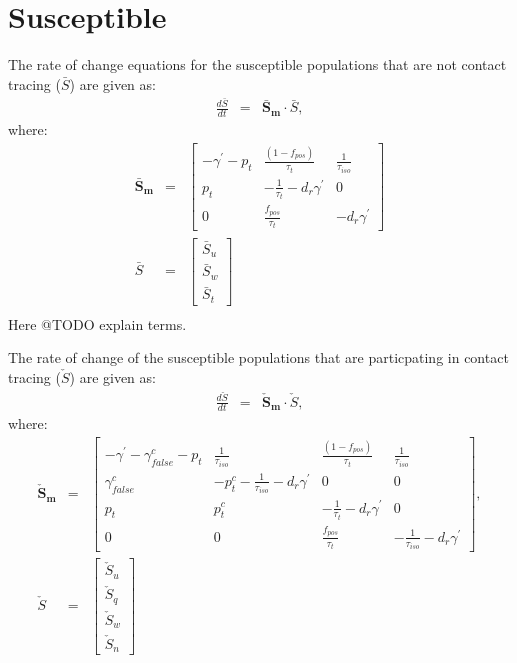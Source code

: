 \documentclass[notitlepage, superscriptaddress]{revtex4-2}
\begin{document}
\section{Susceptible}
The rate of change equations for the susceptible populations that are not contact tracing ($\bar{S}$) are given as:
\begin{eqnarray}
\frac{d\bar{S}}{dt} &=& \boldsymbol{\bar{S}_{m}} \cdot  \bar{S}, 
\end{eqnarray}
where:
\begin{eqnarray}
\boldsymbol{\bar{S}_{m}} &=&
\begin{bmatrix}
-\gamma^{'} - p_{t}  &  \frac{(1-f_{pos})}{\tau_{t}}             & \frac{1}{\tau_{iso}} \\ 
 p_{t}              & -\frac{1}{\tau_{t}} - d_{r} \gamma^{'}    & 0  \\ 
 0                  & \frac{f_{pos}}{\tau_{t}}                  &  -d_{r} \gamma^{'}
\end{bmatrix} \\ 
%
\bar{S} &=& 
\begin{bmatrix}
\bar{S}_{u} \\ \bar{S}_{w}\\ \bar{S}_{t}
\end{bmatrix} \\
\end{eqnarray}
Here @TODO explain terms.

The rate of change of the susceptible populations that are particpating in contact tracing ($\check{S}$) are given as:
\begin{eqnarray}
\frac{d\check{S}}{dt} &=& \boldsymbol{\check{S}_{m}} \cdot \check{S},
\end{eqnarray}
where:
\begin{eqnarray}
\boldsymbol{\check{S}_{m}} &=&
\begin{bmatrix}
-\gamma^{'} -\gamma^{c}_{false} - p_{t}  & \frac{1}{\tau_{iso}}     & \frac{(1-f_{pos})}{\tau_{t}}             & \frac{1}{\tau_{iso}} \\ 
\gamma^{c}_{false}          &  -p^{c}_{t}  - \frac{1}{\tau_{iso}} -d_{r} \gamma^{'}          &  0    & 0  \\ 
p_{t}                          &  p^{c}_{t}                  &  -\frac{1}{\tau_{t}}  -d_{r} \gamma^{'}  & 0 \\
0 & 0 & \frac{f_{pos}}{\tau_{t}}  & -\frac{1}{\tau_{iso}}  -d_{r} \gamma^{'}
\end{bmatrix}, \\
\check{S} &=& 
\begin{bmatrix}
\check{S}_{u} \\ \check{S}_{q} \\ \check{S}_{w}\\ \check{S}_{n}
\end{bmatrix}
\end{eqnarray}
\end{document}
